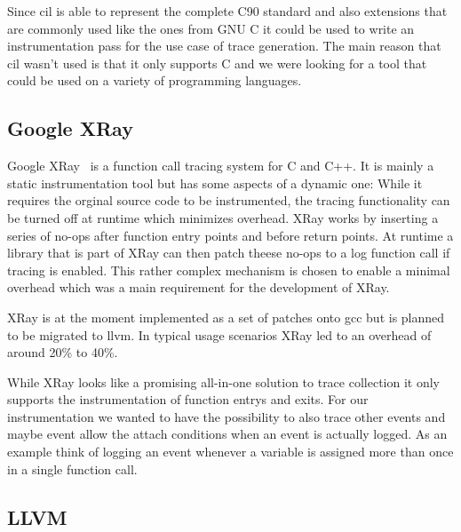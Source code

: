 Since \gls{cil} is able to represent the complete C90 standard and also extensions that are commonly used like the ones from GNU C it could be used to write an instrumentation pass for the use case of trace generation.
The main reason that \gls{cil} wasn't used is that it only supports C and we were looking for a tool that could be used on a variety of programming languages.

\subsection{Google XRay}

Google XRay~\cite{Berris2016} is a function call tracing system for C and C++.
It is mainly a static instrumentation tool but has some aspects of a dynamic one: While it requires the orginal source code to be instrumented, the tracing functionality can be turned off at runtime which minimizes overhead.
XRay works by inserting a series of no-ops after function entry points and before return points.
At runtime a library that is part of XRay can then patch theese no-ops to a log function call if tracing is enabled.
This rather complex mechanism is chosen to enable a minimal overhead which was a main requirement for the development of XRay.

XRay is at the moment implemented as a set of patches onto \gls{gcc} but is planned to be migrated to \gls{llvm}.
In typical usage scenarios XRay led to an overhead of around 20\% to 40\%.

While XRay looks like a promising all-in-one solution to trace collection it only supports the instrumentation of function entrys and exits.
For our instrumentation we wanted to have the possibility to also trace other events and maybe event allow the attach conditions when an event is actually logged.
As an example think of logging an event whenever a variable is assigned more than once in a single function call.

\subsection{LLVM}
\label{sec:related:traces:llvm}

